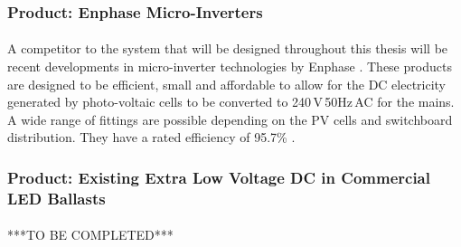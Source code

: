 \subsubsection{Product: Enphase Micro-Inverters}

\paragraph{}
A competitor to the system that will be designed throughout this thesis will be recent developments in micro-inverter technologies by Enphase \cite{website:Enphase}. These products are designed to be efficient, small and affordable to allow for the DC electricity generated by photo-voltaic cells to be converted to 240\,V\,50Hz\,AC for the mains. A wide range of fittings are possible depending on the PV cells and switchboard distribution. They have a rated efficiency of 95.7\% \cite{website:Enphase}. 

\subsubsection{Product: Existing Extra Low Voltage DC in Commercial LED Ballasts}

\paragraph{}
***TO BE COMPLETED***
 
\newpage